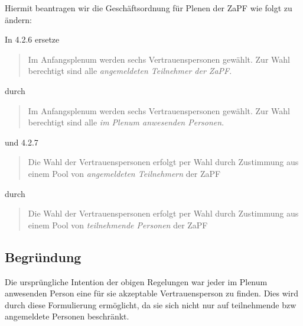 \documentclass[draft,10pt,oneside]{scrartcl}
\begin{document}
Hiermit beantragen wir die Geschäftsordnung für Plenen der ZaPF wie folgt zu
ändern:

In 4.2.6 ersetze
\begin{quote}
  Im Anfangsplenum werden sechs Vertrauenspersonen gewählt. Zur Wahl berechtigt
  sind alle \emph{angemeldeten Teilnehmer der ZaPF}.
\end{quote}
durch
\begin{quote}
  Im Anfangsplenum werden sechs Vertrauenspersonen gewählt. Zur Wahl berechtigt
  sind alle \emph{im Plenum anwesenden Personen}.
\end{quote}
und 4.2.7
\begin{quote}
  Die Wahl der Vertrauenspersonen erfolgt per Wahl durch Zustimmung aus einem
  Pool von \emph{angemeldeten Teilnehmern} der ZaPF
\end{quote}
durch
\begin{quote}
  Die Wahl der Vertrauenspersonen erfolgt per Wahl durch Zustimmung aus einem
  Pool von \emph{teilnehmende Personen} der ZaPF
\end{quote}

\subsection*{Begründung}

Die ursprüngliche Intention der obigen Regelungen war jeder im Plenum anwesenden
Person eine für sie akzeptable Vertrauensperson zu finden. Dies wird durch diese
Formulierung ermöglicht, da sie sich nicht nur auf teilnehmende bzw angemeldete
Personen beschränkt.

\newpage
\end{document}
